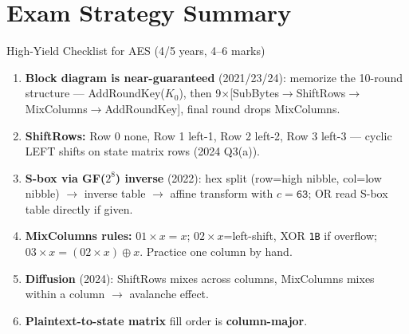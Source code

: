 \documentclass[12pt,a4paper]{article}
\begin{document}
\section*{Exam Strategy Summary}

\begin{keybox}{High-Yield Checklist for AES (4/5 years, 4--6 marks)}
\begin{enumerate}[noitemsep]
  \item \textbf{Block diagram is near-guaranteed} (2021/23/24): memorize the 10-round structure --- AddRoundKey($K_0$), then 9$\times$[SubBytes$\to$ShiftRows$\to$MixColumns$\to$AddRoundKey], final round drops MixColumns.
  \item \textbf{ShiftRows:} Row 0 none, Row 1 left-1, Row 2 left-2, Row 3 left-3 --- cyclic LEFT shifts on state matrix rows (2024 Q3(a)).
  \item \textbf{S-box via GF($2^8$) inverse} (2022): hex split (row=high nibble, col=low nibble) $\to$ inverse table $\to$ affine transform with $c=\texttt{63}$; OR read S-box table directly if given.
  \item \textbf{MixColumns rules:} $01\times x=x$; $02\times x$=left-shift, XOR \texttt{1B} if overflow; $03\times x=(02\times x)\oplus x$. Practice one column by hand.
  \item \textbf{Diffusion} (2024): ShiftRows mixes across columns, MixColumns mixes within a column $\to$ avalanche effect.
  \item \textbf{Plaintext-to-state matrix} fill order is \textbf{column-major}.
\end{enumerate}
\end{keybox}
\end{document}

